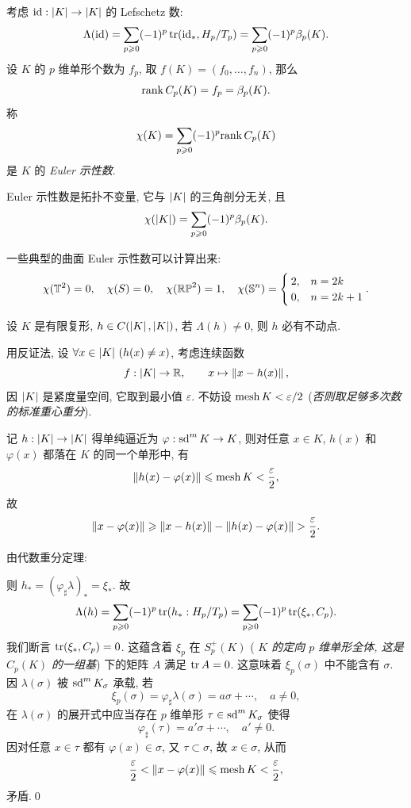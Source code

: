 考虑 $ \mathrm{id} : \left| K \right| \to\left| K \right|  $ 的 Lefschetz 数:
\[
	\Lambda(\mathrm{id})=\sum_{p\geqslant 0}(-1)^p\tr(\mathrm{id}_*,H_p/T_p)=\sum_{p\geqslant 0}(-1)^p\beta_p(K).
\]
设 $ K $ 的 $ p $ 维单形个数为 $ f_p $, 取 $ f(K)=(f_0,\dots,f_n) $, 那么
\[
	\mathrm{rank}\, C_p(K)=f_p=\beta_p(K).
\]
称
\[
	\chi(K)=\sum_{p\geqslant 0}(-1)^p\mathrm{rank}\, C_p(K)
\]
是 $ K $ 的 \emph{Euler 示性数}.

\begin{Theorem}
	Euler 示性数是拓扑不变量, 它与 $ \left| K \right|  $ 的三角剖分无关, 且
	\[
		\chi(\left| K \right| )=\sum_{p\geqslant 0}(-1)^p\beta_p(K).
	\]
\end{Theorem}

一些典型的曲面 Euler 示性数可以计算出来:
\[
	\chi(\mathbb{T}^2)=0,\quad \chi(S)=0,\quad \chi(\mathbb{RP}^2)=1,\quad \chi(\mathbb{S}^n)=\begin{cases}
		2, & n=2k \\ 0, & n=2k+1
	\end{cases}.
\]

\begin{Theorem}\label{thm:Lefschetz 不动点定理}
	设 $ K $ 是有限复形, $ h\in C(\left| K \right| ,\left| K \right| ) $, 若 $ \Lambda(h)\ne 0 $, 则 $ h $ 必有不动点.
\end{Theorem}
\begin{Proof}
	用反证法, 设 $ \forall x\in\left| K \right| \,(h(x)\ne x) $, 考虑连续函数
	\[
		f : \left| K \right| \to\mathbb{R},\qquad x\mapsto\left\| x-h(x) \right\|,
	\]
	因 $ \left| K \right|  $ 是紧度量空间, 它取到最小值 $ \varepsilon $. 不妨设 $ \mathrm{mesh}\, K<\varepsilon/2 $ (\textit{否则取足够多次数的标准重心重分}).

	记 $ h : \left| K \right| \to\left| K \right|  $ 得单纯逼近为 $ \varphi : \mathrm{sd}^m\,K\to K $, 则对任意 $ x\in K $, $ h(x) $ 和 $ \varphi(x) $ 都落在 $ K $ 的同一个单形中, 有
	\[
		\left\| h(x)-\varphi(x) \right\|\leqslant\mathrm{mesh}\, K<\frac{\varepsilon}{2},
	\]
	故
	\[
		\norm{x-\varphi(x)}\geqslant\norm{x-h(x)}-\norm{h(x)-\varphi(x)}>\frac{\varepsilon}{2}.
	\]

	由代数重分定理:
	\begin{center}
	\end{center}
	则 $ h_*=(\varphi_\sharp\lambda)_*=\xi_* $. 故
	\[
		\Lambda(h)=\sum_{p\geqslant 0}(-1)^p\tr(h_* : H_p/T_p)=\sum_{p\geqslant 0}(-1)^p\tr(\xi_*, C_p).
	\]
	我们断言 $ \tr(\xi_*, C_p)=0 $. 这蕴含着 $ \xi_p $ 在 $ S_p^+(K) $ (\textit{ $ K $ 的定向 $ p $ 维单形全体, 这是 $ C_p(K) $ 的一组基}) 下的矩阵 $ A $ 满足 $ \tr A=0 $. 这意味着 $ \xi_p(\sigma) $ 中不能含有 $ \sigma $. 因 $ \lambda(\sigma) $ 被 $ \mathrm{sd}^m\,K_\sigma $ 承载, 若
	\[
		\xi_p(\sigma)=\varphi_\sharp\lambda(\sigma)=a\sigma+\cdots,\quad a\ne 0,
	\]
	在 $ \lambda(\sigma) $ 的展开式中应当存在 $ p $ 维单形 $ \tau\in\mathrm{sd}^m\,K_\sigma $ 使得
	\[
		\varphi_\sharp(\tau)=a'\sigma+\cdots,\quad a'\ne 0.
	\]
	因对任意 $ x\in\tau $ 都有 $ \varphi(x)\in\sigma $, 又 $ \tau\subset\sigma $, 故 $ x\in\sigma $, 从而
	\[
		\frac{\varepsilon}{2}<\left\| x-\varphi(x) \right\|\leqslant\mathrm{mesh}\, K<\frac{\varepsilon}{2},
	\]
	矛盾.\qed
\end{Proof}

